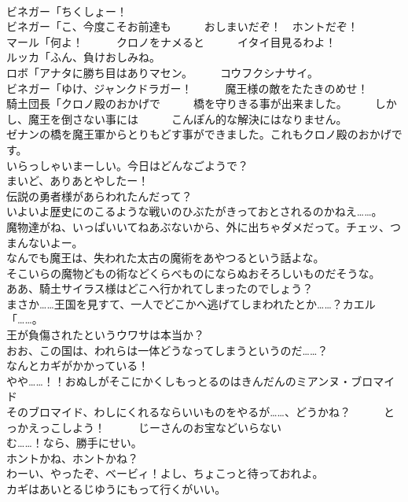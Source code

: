 \documentclass[8pt]{extreport}
\begin{document}
\begin{CJK}{UTF8}{min}
\\	ビネガー「ちくしょー！	
\\	ビネガー「こ、今度こそお前達も　　　おしまいだぞ！　ホントだぞ！	
\\	マール「何よ！　　　クロノをナメると　　　イタイ目見るわよ！	
\\	ルッカ「ふん、負けおしみね。	
\\	ロボ「アナタに勝ち目はありマセン。　　　コウフクシナサイ。	
\\	ビネガー「ゆけ、ジャンクドラガー！　　　魔王様の敵をたたきのめせ！	
\\	騎土団長「クロノ殿のおかげで　　　橋を守りきる事が出来ました。　　　しかし、魔王を倒さない事には　　　こんぽん的な解決にはなりません。	
\\	ゼナンの橋を魔王軍からとりもどす事ができました。これもクロノ殿のおかげです。	
\\	いらっしゃいまーしい。今日はどんなごようで？	
\\	まいど、ありあとやしたー！	
\\	伝説の勇者様があらわれたんだって？	
\\	いよいよ歴史にのこるような戦いのひぶたがきっておとされるのかねえ……。	
\\	魔物達がね、いっぱいいてねあぶないから、外に出ちゃダメだって。チェッ、つまんないよー。	
\\	なんでも魔王は、失われた太古の魔術をあやつるという話よな。	
\\	そこいらの魔物どもの術などくらべものにならぬおそろしいものだそうな。	
\\	ああ、騎土サイラス様はどこへ行かれてしまったのでしょう？	
\\	まさか……王国を見すて、一人でどこかへ逃げてしまわれたとか……？カエル「……。	
\\	王が負傷されたというウワサは本当か？	
\\	おお、この国は、われらは一体どうなってしまうというのだ……？	
\\	なんとカギがかかっている！	
\\	やや……！！おぬしがそこにかくしもっとるのはきんだんのミアンヌ・ブロマイド
\\	そのブロマイド、わしにくれるならいいものをやるが……、どうかね？　　　とっかえっこしよう！　　　じーさんのお宝などいらない	
\\	む……！なら、勝手にせい。	
\\	ホントかね、ホントかね？	
\\	わーい、やったぞ、ベービィ！よし、ちょこっと待っておれよ。	
\\	カギはあいとるじゆうにもって行くがいい。	

\end{CJK}
\end{document}
